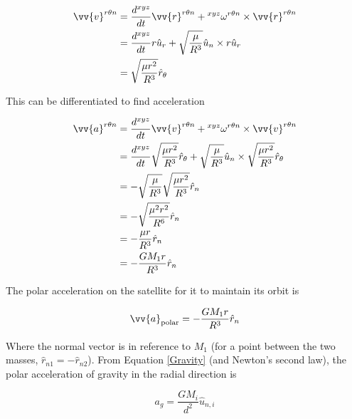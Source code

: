 \documentclass[../basicOrbitalDynamics.tex]{subfiles}
\begin{document}
\begin{align*}
    \vv{v}^{r\theta{}n}&=\frac{d^{xyz}}{dt}{\vv{r}^{r\theta{}n}}+\prescript{xyz}{}{\omega}^{r\theta{}n}\times{}\vv{r}^{r\theta{}n}\\
    &=\frac{d^{xyz}}{dt}{r\hat{u}_r}+\sqrt{\frac{\mu}{R^3}}\hat{u}_n\times r\hat{u}_r\\
    &=\sqrt{\frac{\mu r^2}{R^3}}\hat{r}_\theta\\
\end{align*}

This can be differentiated to find acceleration

\begin{align*}
    \vv{a}^{r\theta{}n}&=\frac{d^{xyz}}{dt}{\vv{v}^{r\theta{}n}}+\prescript{xyz}{}{\omega}^{r\theta{}n}\times{}\vv{v}^{r\theta{}n}\\
    &=\frac{d^{xyz}}{dt}\sqrt{\frac{\mu r^2}{R^3}}\hat{r}_\theta+\sqrt{\frac{\mu}{R^3}}\hat{u}_n\times \sqrt{\frac{\mu r^2}{R^3}}\hat{r}_\theta\\
    &=-\sqrt{\frac{\mu}{R^3}}\sqrt{\frac{\mu r^2}{R^3}}\hat{r}_n\\
    &=-\sqrt{\frac{\mu^2 r^2}{R^6}}\hat{r}_n\\
    &=-\frac{\mu r}{R^3}\hat{r}_n\\
    &=-\frac{GM_1r}{R^3}\hat{r}_n\\
\end{align*}

The polar acceleration on the satellite for it to maintain its orbit is

$$\st{\vv{a}}{polar}=-\frac{GM_1r}{R^3}\hat{r}_n$$

Where the normal vector is in reference to $M_1$ (for a point between the two masses, $\hat{r}_{n1}=-\hat{r}_{n2}$). From Equation \eqref{Gravity} (and Newton's second law), the polar acceleration of gravity in the radial direction is

$$a_g=\frac{GM_i}{d^2}\hat{u}_{n,i}$$
\end{document}
